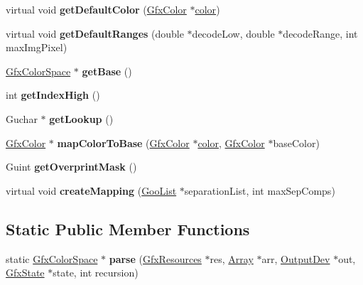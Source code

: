 \begin{DoxyCompactItemize}
virtual void {\bfseries get\+Default\+Color} (\hyperlink{struct_gfx_color}{Gfx\+Color} $\ast$\hyperlink{structcolor}{color})
\item 
\mbox{\label{class_gfx_indexed_color_space_a77d57ba1ca5e70c6845ab24d29c6362c}} 
virtual void {\bfseries get\+Default\+Ranges} (double $\ast$decode\+Low, double $\ast$decode\+Range, int max\+Img\+Pixel)
\item 
\mbox{\label{class_gfx_indexed_color_space_a2e043e3e558290838891aabc010e91ca}} 
\hyperlink{class_gfx_color_space}{Gfx\+Color\+Space} $\ast$ {\bfseries get\+Base} ()
\item 
\mbox{\label{class_gfx_indexed_color_space_a87dd9c1c32b1c13956fba2cacb852357}} 
int {\bfseries get\+Index\+High} ()
\item 
\mbox{\label{class_gfx_indexed_color_space_aeacfdb57b2f46be08706d3bb12c2566b}} 
Guchar $\ast$ {\bfseries get\+Lookup} ()
\item 
\mbox{\label{class_gfx_indexed_color_space_a7df483e62535d65be47f6cf0d68a40ff}} 
\hyperlink{struct_gfx_color}{Gfx\+Color} $\ast$ {\bfseries map\+Color\+To\+Base} (\hyperlink{struct_gfx_color}{Gfx\+Color} $\ast$\hyperlink{structcolor}{color}, \hyperlink{struct_gfx_color}{Gfx\+Color} $\ast$base\+Color)
\item 
\mbox{\label{class_gfx_indexed_color_space_a01ba90db3ab1404757edb8927d2d6bd2}} 
Guint {\bfseries get\+Overprint\+Mask} ()
\item 
\mbox{\label{class_gfx_indexed_color_space_a740065fe2797916b09cb6ed13e77d559}} 
virtual void {\bfseries create\+Mapping} (\hyperlink{class_goo_list}{Goo\+List} $\ast$separation\+List, int max\+Sep\+Comps)
\end{DoxyCompactItemize}
\subsection*{Static Public Member Functions}
\begin{DoxyCompactItemize}
\item 
\mbox{\label{class_gfx_indexed_color_space_a8d53a06d30d49b0b4d4761935d1e2aff}} 
static \hyperlink{class_gfx_color_space}{Gfx\+Color\+Space} $\ast$ {\bfseries parse} (\hyperlink{class_gfx_resources}{Gfx\+Resources} $\ast$res, \hyperlink{class_array}{Array} $\ast$arr, \hyperlink{class_output_dev}{Output\+Dev} $\ast$out, \hyperlink{class_gfx_state}{Gfx\+State} $\ast$state, int recursion)
\end{DoxyCompactItemize}
